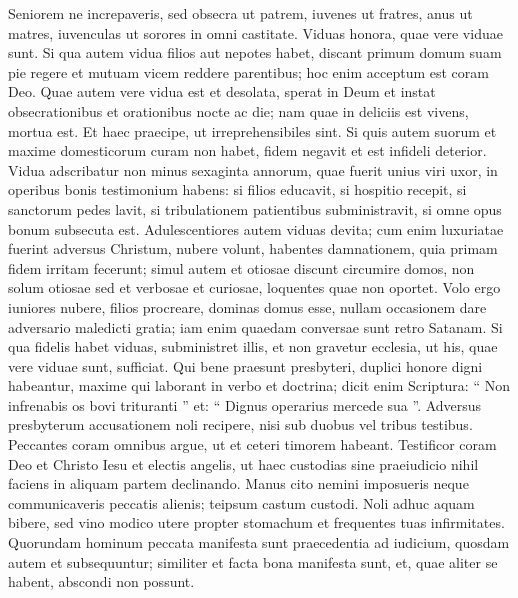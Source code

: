 \begin{biblechapter}
\begin{biblechapter}
\begin{biblechapter}
\begin{biblechapter}
\begin{biblechapter}
\verse Seniorem ne increpaveris, sed obsecra ut patrem, iuvenes ut fratres, 
\verse anus ut matres, iuvenculas ut sorores in omni castitate. 
\verse Viduas honora, quae vere viduae sunt. 
\verse Si qua autem vidua filios aut nepotes habet, discant primum domum suam pie regere et mutuam vicem reddere parentibus; hoc enim acceptum est coram Deo. 
\verse Quae autem vere vidua est et desolata, sperat in Deum et instat obsecrationibus et orationibus nocte ac die; 
\verse nam quae in deliciis est vivens, mortua est. 
\verse Et haec praecipe, ut irreprehensibiles sint. 
\verse Si quis autem suorum et maxime domesticorum curam non habet, fidem negavit et est infideli deterior.
 \verse Vidua adscribatur non minus sexaginta annorum, quae fuerit unius viri uxor, 
\verse in operibus bonis testimonium habens: si filios educavit, si hospitio recepit, si sanctorum pedes lavit, si tribulationem patientibus subministravit, si omne opus bonum subsecuta est. 
\verse Adulescentiores autem viduas devita; cum enim luxuriatae fuerint adversus Christum, nubere volunt, 
\verse habentes damnationem, quia primam fidem irritam fecerunt; 
\verse simul autem et otiosae discunt circumire domos, non solum otiosae sed et verbosae et curiosae, loquentes quae non oportet. 
\verse Volo ergo iuniores nubere, filios procreare, dominas domus esse, nullam occasionem dare adversario maledicti gratia; 
\verse iam enim quaedam conversae sunt retro Satanam.
 \verse Si qua fidelis habet viduas, subministret illis, et non gravetur ecclesia, ut his, quae vere viduae sunt, sufficiat.
 \verse Qui bene praesunt presbyteri, duplici honore digni habeantur, maxime qui laborant in verbo et doctrina; 
\verse dicit enim Scriptura: “ Non infrenabis os bovi trituranti ” et: “ Dignus operarius mercede sua ”. 
\verse Adversus presbyterum accusationem noli recipere, nisi sub duobus vel tribus testibus. 
\verse Peccantes coram omnibus argue, ut et ceteri timorem habeant. 
\verse Testificor coram Deo et Christo Iesu et electis angelis, ut haec custodias sine praeiudicio nihil faciens in aliquam partem declinando. 
\verse Manus cito nemini imposueris neque communicaveris peccatis alienis; teipsum castum custodi.
 \verse Noli adhuc aquam bibere, sed vino modico utere propter stomachum et frequentes tuas infirmitates.
 \verse Quorundam hominum peccata manifesta sunt praecedentia ad iudicium, quosdam autem et subsequuntur; 
\verse similiter et facta bona manifesta sunt, et, quae aliter se habent, abscondi non possunt.
 

\end{biblechapter}
\end{biblechapter}
\end{biblechapter}
\end{biblechapter}
\end{biblechapter}
